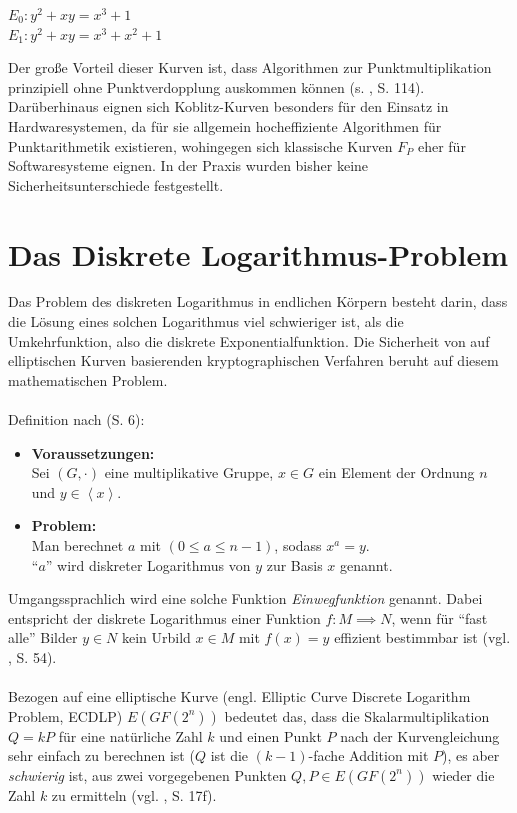 \begin{center}
$E_0 : y^2 + x y = x^3 + 1 $ \\
$E_1 : y^2 + x y = x^3 + x^2 + 1 $
\end{center}

Der große Vorteil dieser Kurven ist, dass Algorithmen zur Punktmultiplikation prinzipiell ohne Punktverdopplung auskommen können (s. \cite{guide}, S. 114). Darüberhinaus eignen sich Koblitz-Kurven besonders für den Einsatz in Hardwaresystemen, da für sie allgemein hocheffiziente Algorithmen für Punktarithmetik existieren, wohingegen sich klassische Kurven $F_P$ eher für Softwaresysteme eignen. In der Praxis wurden bisher keine Sicherheitsunterschiede festgestellt.

\section{Das Diskrete Logarithmus-Problem} \label{sec:dlp}

Das Problem des diskreten Logarithmus in endlichen Körpern besteht darin, dass die Lösung eines solchen Logarithmus viel schwieriger ist, als die Umkehrfunktion, also die diskrete Exponentialfunktion. Die Sicherheit von auf elliptischen Kurven basierenden kryptographischen Verfahren beruht auf diesem mathematischen Problem. 
\\ \\
Definition nach \cite{baum} (S. 6):
\begin{itemize}
	\item \textbf{Voraussetzungen:}\\
	Sei $(G,\cdot)$ eine multiplikative Gruppe, $x \in G$ ein Element der Ordnung $n$ und $y \in \left \langle x \right \rangle$.
	\item \textbf{Problem:}\\
	Man berechnet $a$ mit $(0 \le a \le n-1)$, sodass $x^a = y$. \\
	``$a$'' wird diskreter Logarithmus von $y$ zur Basis $x$ genannt. \\
\end{itemize}

Umgangssprachlich wird eine solche Funktion \textit{Einwegfunktion} genannt. Dabei entspricht der diskrete Logarithmus einer Funktion $f: M \implies N$, wenn für ``fast alle'' Bilder $y \in N$ kein Urbild $x \in M$ mit $f(x) = y$ effizient bestimmbar ist (vgl. \cite{diskrlog}, S. 54).
\\ \\
Bezogen auf eine elliptische Kurve (engl. Elliptic Curve Discrete Logarithm Problem, ECDLP) $E(GF(2^n))$ bedeutet das, dass die Skalarmultiplikation $Q = k P$ für eine natürliche Zahl $k$ und einen Punkt $P$ nach der Kurvengleichung sehr einfach zu berechnen ist ($Q$ ist die $(k-1)$-fache Addition mit $P$), es aber \textit{schwierig} ist, aus zwei vorgegebenen Punkten $Q, P \in E(GF(2^n))$ wieder die Zahl $k$ zu ermitteln (vgl. \cite{puttmann}, S. 17f).

